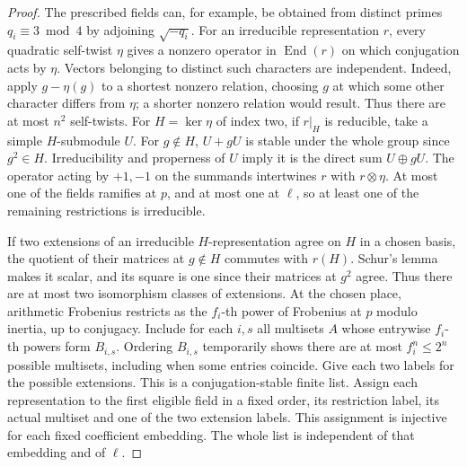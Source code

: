 \begin{proof}
The prescribed fields can, for example, be obtained from distinct
primes \(q_i\equiv3\bmod4\) by adjoining \(\sqrt{-q_i}\).
For an irreducible representation \(r\), every quadratic self-twist
\(\eta\) gives a nonzero operator in \(\operatorname{End}(r)\) on
which conjugation acts by \(\eta\). Vectors belonging to distinct such
characters are independent. Indeed, apply \(g-\eta(g)\) to a shortest
nonzero relation, choosing \(g\) at which some other character differs
from \(\eta\); a shorter nonzero relation would result. Thus there are
at most \(n^2\) self-twists. For \(H=\ker\eta\) of index two, if
\(r|_H\) is reducible, take a simple \(H\)-submodule \(U\).
For \(g\notin H\), \(U+gU\) is stable under the whole group since
\(g^2\in H\). Irreducibility and properness of \(U\) imply it is
the direct sum \(U\oplus gU\). The operator acting by \(+1,-1\)
on the summands intertwines \(r\) with \(r\otimes\eta\).
At most one of the fields ramifies at \(p\), and at most one at
\(\ell\), so at least one of the remaining restrictions is irreducible.

If two extensions of an irreducible \(H\)-representation agree on \(H\)
in a chosen basis, the quotient of their matrices at \(g\notin H\)
commutes with \(r(H)\). Schur's lemma makes it scalar, and its square
is one since their matrices at \(g^2\) agree. Thus there are at most
two isomorphism classes of extensions. At the chosen place, arithmetic
Frobenius restricts as the \(f_i\)-th power of Frobenius at \(p\)
modulo inertia, up to conjugacy. Include for each \(i,s\) all multisets
\(A\) whose entrywise \(f_i\)-th powers form \(B_{i,s}\).
Ordering \(B_{i,s}\) temporarily shows there are at most
\(f_i^n\le2^n\) possible multisets, including when some entries
coincide. Give each two labels for the possible extensions. This is a
conjugation-stable finite list. Assign each representation to the first
eligible field in a fixed order, its restriction label, its actual
multiset and one of the two extension labels. This assignment is
injective for each fixed coefficient embedding. The whole list is
independent of that embedding and of \(\ell\).
\end{proof}

